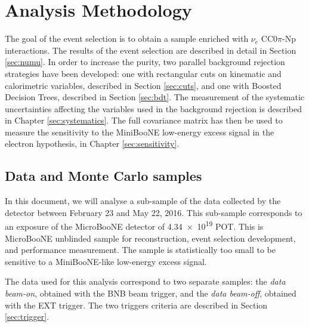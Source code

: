 \section{Analysis Methodology}
\label{sec:methodology}
The goal of the event selection is to obtain a sample enriched with $\nu_{e}$ CC0$\pi$-Np interactions. The results of the event selection are described in detail in Section \ref{sec:numu}. In order to increase the purity, two parallel background rejection strategies have been developed: one with rectangular cuts on kinematic and calorimetric variables, described in Section \ref{sec:cuts}, and one with Boosted Decision Trees, described in Section \ref{sec:bdt}.
The measurement of the systematic uncertainties affecting the variables used in the background rejection is described in Chapter \ref{sec:systematics}. The full covariance matrix has then be used to measure the sensitivity to the MiniBooNE low-energy excess signal in the electron hypothesis, in Chapter \ref{sec:sensitivity}.

\subsection{Data and Monte Carlo samples}\label{sec:data}
In this document, we will analyse a sub-sample of the data collected by the detector between February 23 and May 22, 2016. This sub-sample corresponds to an exposure of the MicroBooNE detector of \num{4.34e19} POT. This is MicroBooNE unblinded sample for reconstruction, event selection development, and performance measurement. The sample is statistically too small to be sensitive to a MiniBooNE-like low-energy excess signal. 

The data used for this analysis correspond to two separate samples: the \emph{data beam-on}, obtained with the BNB beam trigger, and the \emph{data beam-off}, obtained with the EXT trigger. The two triggers criteria are described in Section \ref{sec:trigger}.

